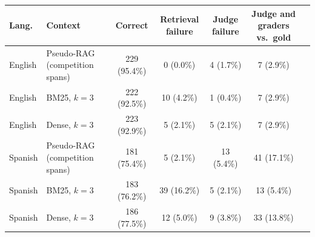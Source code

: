 \begin{tabular}{llccccc}
\hline
\textbf{Lang.} & \textbf{Context} & \textbf{Correct} & \textbf{Retrieval failure} & \textbf{Judge failure} & \textbf{Judge and graders vs.\ gold} \\
\hline
English & Pseudo-RAG (competition spans) & 229 (95.4\%) & 0 (0.0\%) & 4 (1.7\%) & 7 (2.9\%) \\
English & BM25, $k=3$ & 222 (92.5\%) & 10 (4.2\%) & 1 (0.4\%) & 7 (2.9\%) \\
English & Dense, $k=3$ & 223 (92.9\%) & 5 (2.1\%) & 5 (2.1\%) & 7 (2.9\%) \\
Spanish & Pseudo-RAG (competition spans) & 181 (75.4\%) & 5 (2.1\%) & 13 (5.4\%) & 41 (17.1\%) \\
Spanish & BM25, $k=3$ & 183 (76.2\%) & 39 (16.2\%) & 5 (2.1\%) & 13 (5.4\%) \\
Spanish & Dense, $k=3$ & 186 (77.5\%) & 12 (5.0\%) & 9 (3.8\%) & 33 (13.8\%) \\
\hline
\end{tabular}
